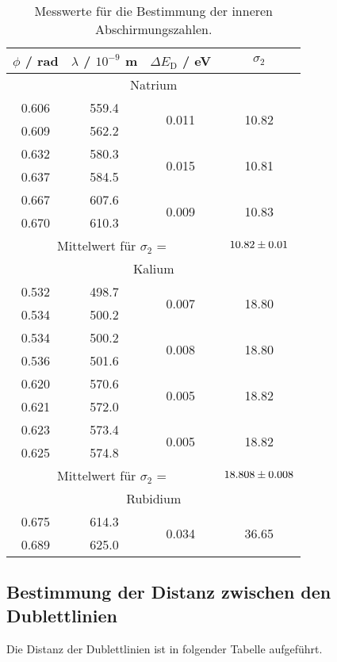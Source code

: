 \begin{table}[H]
  \centering
  \begin{tabular}{c|c|c|c}
    \hline
    $\phi$ / rad & $\lambda$ / $10^{-9}$ m & $\Delta E_\text{D}$ / eV & $\sigma_2$ \\
    \hline
    \multicolumn{4}{c}{Natrium} \\
    \hline
    0.606 & 559.4 & \multirow{2}{*}{0.011} & \multirow{2}{*}{10.82} \\
    0.609 & 562.2 & & \\
    \hline
    0.632 & 580.3 & \multirow{2}{*}{0.015} & \multirow{2}{*}{10.81} \\
    0.637 & 584.5 & & \\
    \hline
    0.667 & 607.6 & \multirow{2}{*}{0.009} & \multirow{2}{*}{10.83} \\
    0.670 & 610.3 & & \\
    \hline
    \multicolumn{3}{c}{Mittelwert für $\sigma_2$ =} & $\num{10.82 +- 0.01}$ \\
    \hline
    \multicolumn{4}{c}{Kalium} \\
    \hline
    0.532 & 498.7 & \multirow{2}{*}{0.007} & \multirow{2}{*}{18.80} \\
    0.534 & 500.2 & & \\
    \hline
    0.534 & 500.2 & \multirow{2}{*}{0.008} & \multirow{2}{*}{18.80} \\
    0.536 & 501.6 & & \\
    \hline
    0.620 & 570.6 & \multirow{2}{*}{0.005} & \multirow{2}{*}{18.82} \\
    0.621 & 572.0 & & \\
    \hline
    0.623 & 573.4 & \multirow{2}{*}{0.005} & \multirow{2}{*}{18.82} \\
    0.625 & 574.8 & & \\
    \hline
    \multicolumn{3}{c}{Mittelwert für $\sigma_2$ =} & $\num{18.808 +- 0.008}$ \\
    \hline
    \multicolumn{4}{c}{Rubidium} \\
    \hline
    0.675 & 614.3 & \multirow{2}{*}{0.034} & \multirow{2}{*}{36.65} \\
    0.689 & 625.0 & & \\
    \hline
  \end{tabular}
  \caption{Messwerte für die Bestimmung der inneren Abschirmungszahlen.}
  \label{tab:Mess3}
\end{table}

\subsection{Bestimmung der Distanz zwischen den Dublettlinien}
Die Distanz der Dublettlinien ist in folgender Tabelle aufgeführt.

